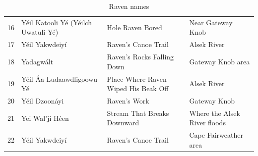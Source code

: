 \begin{table}[!h]
\begin{tabular}{l | L{3cm} | L{3cm} | L{4cm}}
16
&Yéil Katooli Yé
(Yéilch Uwatuli Yé)
&Hole Raven Bored
&Near Gateway Knob \\

17
&Yéil Yakwdeiyí
&Raven’s Canoe Trail
&Alsek River \\

18
&Yadagwált
&Raven’s Rocks Falling Down
&Gateway Knob area \\

19
&Yéil Áa Ludaawdligoowu Yé
&Place Where Raven Wiped His Beak Off
&Alsek River \\

20
&Yéil Dzoonáyi
&Raven’s Work
&Gateway Knob \\

21
&Yei Wal'ji Héen
&Stream That Breaks Downward
&Where the Alsek River floods \\

22
&Yéil Yakwdeiyí
&Raven’s Canoe Trail
&Cape Fairweather area \\

    \end{tabular}
    \caption{Raven names}
    \label{table1}
\end{table}

